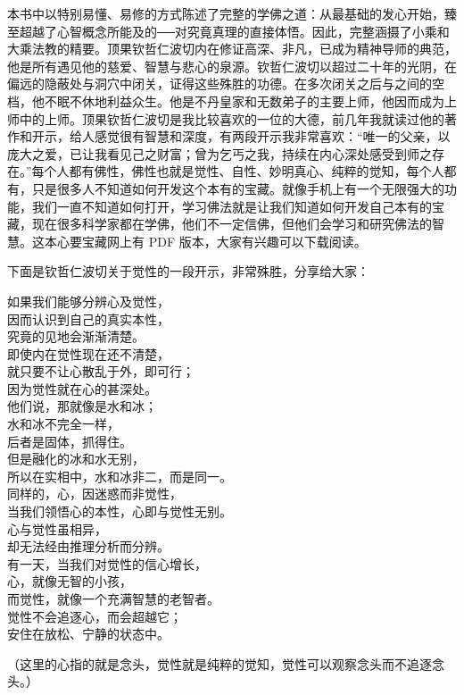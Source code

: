 \begin{book}
    本书中以特别易懂、易修的方式陈述了完整的学佛之道：从最基础的发心开始，臻至超越了心智概念所能及的──对究竟真理的直接体悟。因此，完整涵摄了小乘和大乘法教的精要。顶果钦哲仁波切内在修证高深、非凡，已成为精神导师的典范，他是所有遇见他的慈爱、智慧与悲心的泉源。钦哲仁波切以超过二十年的光阴，在偏远的隐蔽处与洞穴中闭关，证得这些殊胜的功德。在多次闭关之后与之间的空档，他不眠不休地利益众生。他是不丹皇家和无数弟子的主要上师，他因而成为上师中的上师。顶果钦哲仁波切是我比较喜欢的一位的大德，前几年我就读过他的著作和开示，给人感觉很有智慧和深度，有两段开示我非常喜欢：“唯一的父亲，以庞大之爱，已让我看见己之财富；曾为乞丐之我，持续在内心深处感受到师之存在。”每个人都有佛性，佛性也就是觉性、自性、妙明真心、纯粹的觉知，每个人都有，只是很多人不知道如何开发这个本有的宝藏。就像手机上有一个无限强大的功能，我们一直不知道如何打开，学习佛法就是让我们知道如何开发自己本有的宝藏，现在很多科学家都在学佛，他们不一定信佛，但他们会学习和研究佛法的智慧。这本心要宝藏网上有 PDF 版本，大家有兴趣可以下载阅读。

    下面是钦哲仁波切关于觉性的一段开示，非常殊胜，分享给大家：

    \begin{multicols}{2}
        \begin{center}
            如果我们能够分辨心及觉性， \\ 因而认识到自己的真实本性， \\ 究竟的见地会渐渐清楚。 \\ 即使内在觉性现在还不清楚， \\ 就只要不让心散乱于外，即可行； \\ 因为觉性就在心的甚深处。 \\ 他们说，那就像是水和冰； \\ 水和冰不完全一样， \\ 后者是固体，抓得住。 \\ 但是融化的冰和水无别， \\ 所以在实相中，水和冰非二，而是同一。 \\ 同样的，心，因迷惑而非觉性， \\ 当我们领悟心的本性，心即与觉性无别。 \\ 心与觉性虽相异， \\ 却无法经由推理分析而分辨。 \\ 有一天，当我们对觉性的信心增长， \\ 心，就像无智的小孩， \\ 而觉性，就像一个充满智慧的老智者。 \\ 觉性不会追逐心，而会超越它； \\ 安住在放松、宁静的状态中。
        \end{center}
    \end{multicols}

    （这里的心指的就是念头，觉性就是纯粹的觉知，觉性可以观察念头而不追逐念头。）
\end{book}
